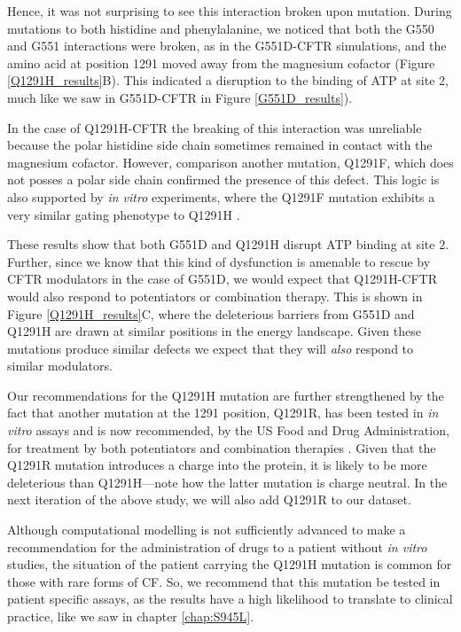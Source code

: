 Hence, it was not surprising to see this interaction broken upon mutation. During mutations to both histidine and phenylalanine, we noticed that both the G550 and G551 interactions were broken, as in the G551D-CFTR simulations, and the amino acid at position 1291 moved away from the magnesium cofactor (Figure \ref{Q1291H_results}B). This indicated a disruption to the binding of ATP at site 2, much like we saw in G551D-CFTR in Figure \ref{G551D_results}). 

In the case of Q1291H-CFTR the breaking of this interaction was unreliable because the polar histidine side chain sometimes remained in contact with the magnesium cofactor. However, comparison another mutation, Q1291F, which does not posses a polar side chain confirmed the presence of this defect. This logic is also supported by \textit{in vitro} experiments, where the Q1291F mutation exhibits a very similar gating phenotype to Q1291H \cite{dong2015}. 

These results show that both G551D and Q1291H disrupt ATP binding at site 2. Further, since we know that this kind of dysfunction is amenable to rescue by CFTR modulators in the case of G551D, we would expect that Q1291H-CFTR would also respond to potentiators or combination therapy. This is shown in Figure \ref{Q1291H_results}C, where the deleterious barriers from G551D and Q1291H are drawn at similar positions in the energy landscape. Given these mutations produce similar defects we expect that they will \textit{also} respond to similar modulators.

Our recommendations for the Q1291H mutation are further strengthened by the fact that another mutation at the 1291 position, Q1291R, has been tested in \textit{in vitro} assays and is now recommended, by the US Food and Drug Administration, for treatment by both potentiators and combination therapies \cite{trikafta_website, trikafta_FDA_info, kalydeco_FDA_approval}. Given that the Q1291R mutation introduces a charge into the protein, it is likely to be more deleterious than Q1291H---note how the latter mutation is charge neutral. In the next iteration of the above study, we will also add Q1291R to our dataset. 

Although computational modelling is not sufficiently advanced to make a recommendation for the administration of drugs to a patient without \textit{in vitro} studies, the situation of the patient carrying the Q1291H mutation is common for those with rare forms of CF. So, we recommend that this mutation be tested in patient specific assays, as the results have a high likelihood to translate to clinical practice, like we saw in chapter \ref{chap:S945L}. 


